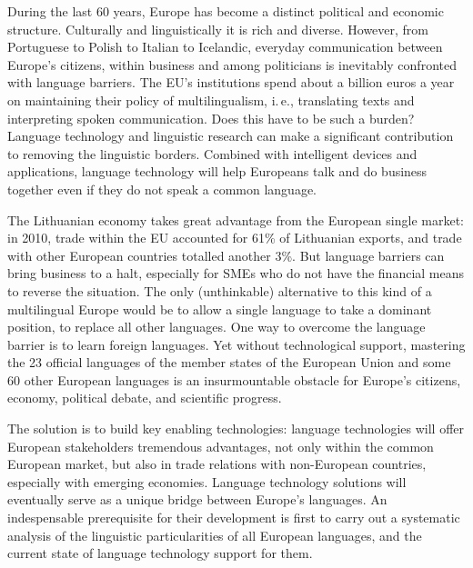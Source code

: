 \documentclass[]{../metanetpaper}
\begin{document}
\begin{multicols}{2}

During the last 60 years, Europe has become a distinct political and economic structure. Culturally and linguistically it is rich and diverse. However, from Portuguese to Polish to Italian to Icelandic, everyday communication between Europe’s citizens, within business and among politicians is inevitably confronted with language barriers. The EU's institutions spend about a billion euros a year on maintaining their policy of multilingualism, i.\,e., translating texts and interpreting spoken communication. Does this have to be such a burden? Language technology and linguistic research can make a significant contribution to removing the linguistic borders. Combined with intelligent devices and applications, language technology will help Europeans talk and do business together even if they do not speak a common language. 


The Lithuanian economy takes great advantage from the European single market: in 2010, trade within the EU accounted for 61\% of Lithuanian exports, and trade with other European countries totalled another 3\%. But language barriers can bring business to a halt, especially for SMEs who do not have the financial means to reverse the situation. The only (unthinkable) alternative to this kind of a multilingual Europe would be to allow a single language to take a dominant position, to replace all other languages. 
One way to overcome the language barrier is to learn foreign languages. Yet without technological support, mastering the 23 official languages of the member states of the European Union and some 60 other European languages is an insurmountable obstacle for Europe’s citizens, economy, political debate, and scientific progress. 

The solution is to build key enabling technologies: language technologies will offer European stakeholders tremendous advantages, not only within the common European market, but also in trade relations with non-European countries, especially with emerging economies. Language technology solutions will eventually serve as a unique bridge between Europe's languages. An indespensable prerequisite for their development is first to carry out a systematic analysis of the linguistic particularities of all European languages, and the current state of language technology support for them.  
    

\end{multicols}
\end{document}
